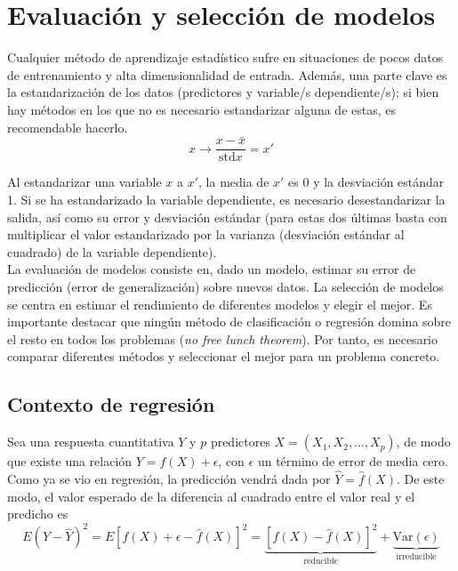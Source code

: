 \chapter{Evaluación y selección de modelos}\label{Chapter4} 

Cualquier método de aprendizaje estadístico sufre en situaciones de pocos datos de entrenamiento y alta dimensionalidad de entrada. Además, una parte clave es la estandarización de los datos (predictores y variable/s dependiente/s); si bien hay métodos en los que no es necesario estandarizar alguna de estas, es recomendable hacerlo. \\
\begin{equation}
x \to \frac{x - \bar{x}}{\text{std}x} = x'
\end{equation}
    
Al estandarizar una variable $x$ a $x'$, la media de $x'$ es 0 y la desviación estándar 1. Si se ha estandarizado la variable dependiente, es necesario desestandarizar la salida, así como su error y desviación estándar (para estas dos últimas basta con multiplicar el valor estandarizado por la varianza (desviación estándar al cuadrado) de la variable dependiente). \\

La evaluación de modelos consiste en, dado un modelo, estimar su error de predicción (error de generalización) sobre nuevos datos. La selección de modelos se centra en estimar el rendimiento de diferentes modelos y elegir el mejor. Es importante destacar que ningún método de clasificación o regresión domina sobre el resto en todos los problemas (\textit{no free lunch theorem}). Por tanto, es necesario comparar diferentes métodos y seleccionar el mejor para un problema concreto. 

\section{Contexto de regresión}

Sea una respuesta cuantitativa $Y$ y $p$ predictores $X = (X_1, X_2, \dots, X_p)$, de modo que existe una relación $Y = f(X) + \epsilon$, con $\epsilon$ un término de error de media cero. Como ya se vio en regresión, la predicción vendrá dada por $\hat{Y} = \hat{f}(X)$. De este modo, el valor esperado de la diferencia al cuadrado entre el valor real y el predicho es
\begin{equation}
E(Y - \hat{Y})^2 = E[f(X) + \epsilon - \hat{f}(X)]^2 = \underbrace{[f(X) - \hat{f}(X)]^2}_{\text{reducible}} + \underbrace{\text{Var}(\epsilon)}_{\text{irreducible}}
\end{equation}

